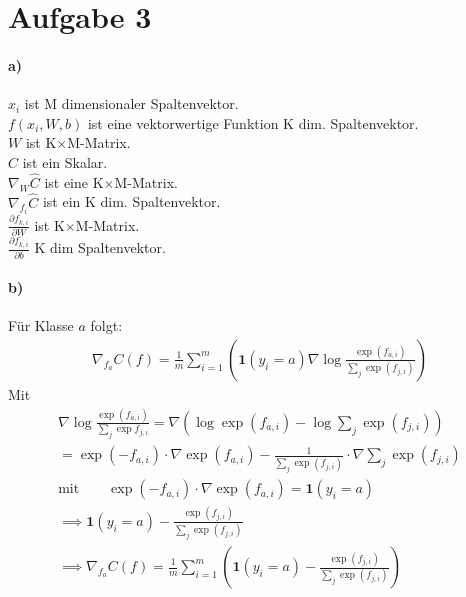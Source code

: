 \section{Aufgabe 3}
\label{sec:Aufgab3}
%
\paragraph{a)} \quad \newline
$x_i$ ist M dimensionaler Spaltenvektor. \\
$f(x_i , W ,b)$ ist eine vektorwertige Funktion \rightarrow K dim. Spaltenvektor. \\
$W$ ist K$\times$M-Matrix. \\
$C$ ist ein Skalar. \\
$\nabla_W \hat{C} $ ist eine K$\times$M-Matrix.\\
$\nabla_{f_i} \hat{C}$ ist ein K dim. Spaltenvektor. \\
$\frac{\partial f_{k,i}}{\partial W}$ ist K$\times$M-Matrix.\\ 
$\frac{\partial f_{k,i}}{\partial b }$ K dim Spaltenvektor.\\
\paragraph{b)}
Für Klasse $a$ folgt:
\begin{gather}
\nabla_{f_a} C(f) = \frac{1}{m} \sum_{i=1}^m \left(\symbf{1}(y_i = a) 
\nabla \log \frac{\exp(f_{a,i})}{\sum_j \exp(f_{j,i})} \right)
\end{gather}
Mit 
\begin{gather}
\nabla \log \frac{\exp(f_{a,i})}{\sum_j \exp{f_{j,i}}} = 
\nabla \left(\log \exp(f_{a,i})- \log\sum_j \exp(f_{j,i})\right) \\
= \exp(-f_{a,i}) \cdot \nabla \exp(f_{a,i}) - \frac{1}{\sum_j \exp(f_{j,i})} \cdot \nabla \sum_j \exp(f_{j,i})\\ 
\text{mit} \qquad  \exp(-f_{a,i}) \cdot \nabla \exp(f_{a,i}) = \symbf{1}(y_i = a) \\
\implies \symbf{1}(y_i = a)- \frac{\exp(f_{j,i})}{\sum_j \exp(f_{j,i})}\\ 
\implies \nabla_{f_a} C(f)=\frac{1}{m} \sum_{i=1}^m \left(\symbf{1}(y_i = a)- \frac{\exp(f_{j,i})}{\sum_j \exp(f_{j,i})} \right)
\end{gather}
